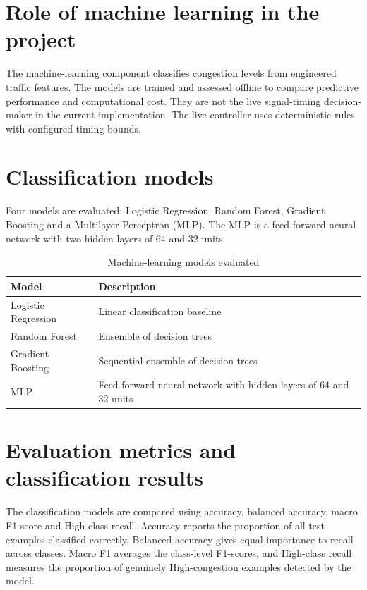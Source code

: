 \documentclass[12pt,a4paper,oneside]{report}
\begin{document}
\section{Role of machine learning in the project}
The machine-learning component classifies congestion levels from engineered traffic features. The models are trained and assessed offline to compare predictive performance and computational cost. They are not the live signal-timing decision-maker in the current implementation. The live controller uses deterministic rules with configured timing bounds.

\section{Classification models}
Four models are evaluated: Logistic Regression, Random Forest, Gradient Boosting and a Multilayer Perceptron (MLP). The MLP is a feed-forward neural network with two hidden layers of 64 and 32 units.

\begin{table}[htbp]\centering\small
\caption{Machine-learning models evaluated}\label{tab:models}
\begin{tabular}{|p{}|p{}|}\hline
\textbf{Model} & \textbf{Description} \\\hline
Logistic Regression & Linear classification baseline \\\hline
Random Forest & Ensemble of decision trees \\\hline
Gradient Boosting & Sequential ensemble of decision trees \\\hline
MLP & Feed-forward neural network with hidden layers of 64 and 32 units \\\hline
\end{tabular}\end{table}

\section{Evaluation metrics and classification results}
The classification models are compared using accuracy, balanced accuracy, macro F1-score and High-class recall. Accuracy reports the proportion of all test examples classified correctly. Balanced accuracy gives equal importance to recall across classes. Macro F1 averages the class-level F1-scores, and High-class recall measures the proportion of genuinely High-congestion examples detected by the model.
\end{document}
